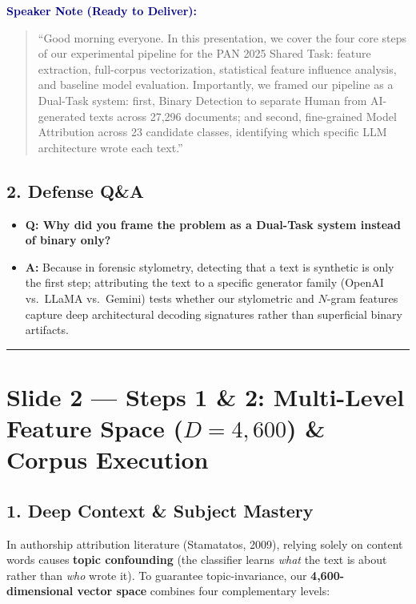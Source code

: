 \documentclass[11pt, a4paper]{article}
\newenvironment{speakernote}{%
    \par\vspace{0.2cm}%
    \noindent\textbf{\textcolor{navy}{Speaker Note (Ready to Deliver):}}\par\vspace{0.1cm}%
    \begin{quote}\itshape\color{slate}%
}{%
    \end{quote}\vspace{0.2cm}%
}
\begin{document}
\begin{speakernote}
``Good morning everyone. In this presentation, we cover the four core steps of our experimental pipeline for the PAN 2025 Shared Task: feature extraction, full-corpus vectorization, statistical feature influence analysis, and baseline model evaluation. Importantly, we framed our pipeline as a Dual-Task system: first, Binary Detection to separate Human from AI-generated texts across 27,296 documents; and second, fine-grained Model Attribution across 23 candidate classes, identifying which specific LLM architecture wrote each text.''
\end{speakernote}

\subsection*{2. Defense Q\&A}
\begin{itemize}[noitemsep]
    \item \textbf{Q: Why did you frame the problem as a Dual-Task system instead of binary only?}
    \item \textbf{A:} Because in forensic stylometry, detecting that a text is synthetic is only the first step; attributing the text to a specific generator family (OpenAI vs.\ LLaMA vs.\ Gemini) tests whether our stylometric and $N$-gram features capture deep architectural decoding signatures rather than superficial binary artifacts.
\end{itemize}

\vspace{0.3cm}\hrule\vspace{0.3cm}

\section{Slide 2 --- Steps 1 \& 2: Multi-Level Feature Space ($D = 4,600$) \& Corpus Execution}

\subsection*{1. Deep Context \& Subject Mastery}
In authorship attribution literature (Stamatatos, 2009), relying solely on content words causes \textbf{topic confounding} (the classifier learns \textit{what} the text is about rather than \textit{who} wrote it). To guarantee topic-invariance, our \textbf{4,600-dimensional vector space} combines four complementary levels:
\end{document}

